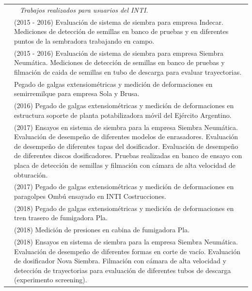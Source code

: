 \documentclass[a4paper,10pt, sans]{article}
\begin{document}
\begin{table}[H]
\begin{tabularx}{\textwidth}{r X}
        {} & ~ \textit{Trabajos realizados para usuarios del INTI.} \\
        {} & (2015 - 2016) Evaluación de sistema de siembra para empresa Indecar. Mediciones de detección de semillas en banco de pruebas y en diferentes puntos de la sembradora trabajando en campo. \\
        {} & (2015 - 2016) Evaluación de sistema de siembra para empresa Siembra Neumática. Mediciones de detección de semillas en banco de pruebas y filmación de caida de semillas en tubo de descarga para evaluar trayectorias. \\
        {} & Pegado de galgas extensiométricas y medición de deformaciones en semirremilque para empresa Sola y Brusa. \\
        {} & (2016) Pegado de galgas extensiométricas y medición de deformaciones en estructura soporte de planta potabilizadora móvil del Ejército Argentino. \\
        {} & (2017) Ensayos en sistema de siembra para la empresa Siembra Neumática. Evaluación de desempeño de diferentes modelos de enrasadores. Evaluación de desempeño de diferentes tapas del dosificador. Evaluación de desempeño de diferentes discos dosificadores. Pruebas realizadas en banco de ensayo con placa de detección de semillas y filmación con cámara de alta velocidad de obturación. \\
        {} & (2017) Pegado de galgas extensiométricas y medición de deformaciones en paragolpes Ombú ensayado en INTI Costrucciones. \\
        {} & (2018) Pegado de galgas extensiométricas y medición de deformaciones en tren trasero de fumigadora Pla. \\
        {} & (2018) Medición de presiones en cabina de fumigadora Pla. \\
        {} & (2018) Ensayos en sistema de siembra para la empresa Siembra Neumática. Evaluación de desempeño de diferentes formas en corte de vacío. Evaluación de dosificador Nova Siembra. Filmación con cámara de alta velocidad y detección de trayectorias para evaluación de diferentes tubos de descarga (experimento screening). \\
\end{tabularx}
\end{table}
\end{document}
